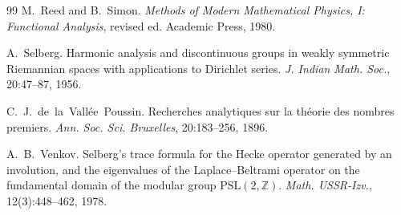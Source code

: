 \documentclass[11pt,a4paper]{article}
\theoremstyle{definition}
\begin{document}
\begin{thebibliography}{99}
M.~Reed and B.~Simon.
\emph{Methods of Modern Mathematical Physics, I: Functional Analysis},
revised ed. Academic Press, 1980.

A.~Selberg.
Harmonic analysis and discontinuous groups in weakly symmetric
Riemannian spaces with applications to Dirichlet series.
\emph{J. Indian Math. Soc.}, 20:47--87, 1956.

C.~J.~de~la~Vall\'{e}e~Poussin.
Recherches analytiques sur la th\'{e}orie des nombres premiers.
\emph{Ann. Soc. Sci. Bruxelles}, 20:183--256, 1896.

A.~B.~Venkov.
Selberg's trace formula for the Hecke operator generated by an
involution, and the eigenvalues of the Laplace--Beltrami operator on
the fundamental domain of the modular group
$\mathrm{PSL}(2,\mathbb{Z})$.
\emph{Math. USSR-Izv.}, 12(3):448--462, 1978.

\end{thebibliography}
\end{document}
